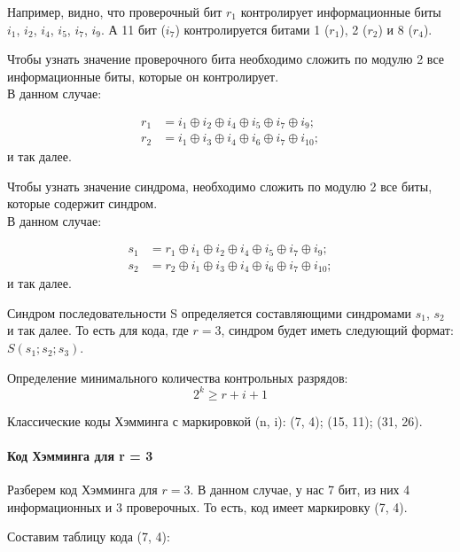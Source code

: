 Например, видно, что проверочный бит $r_1$ контролирует информационные биты $i_1$, $i_2$, $i_4$, $i_5$, $i_7$, $i_9$.
А 11 бит ($i_7$) контролируется битами 1 ($r_1$), 2 ($r_2$) и 8 ($r_4$).

Чтобы узнать значение проверочного бита необходимо сложить по модулю 2 все информационные биты, которые он контролирует. \\
В данном случае:

\noindent
\begin{equation*}
    \begin{aligned}
    r_1 &= i_1\oplus i_2\oplus i_4\oplus i_5\oplus i_7\oplus i_9; \\
    r_2 &= i_1\oplus i_3\oplus i_4\oplus i_6\oplus i_7\oplus i_{10};
    \end{aligned}
\end{equation*}
и так далее.

Чтобы узнать значение синдрома, необходимо сложить по модулю 2 все биты, которые содержит синдром.\\
В данном случае:

\noindent
\begin{equation*}
    \begin{aligned}
    s_1 &= r_1\oplus i_1\oplus i_2\oplus i_4\oplus i_5\oplus i_7\oplus i_9; \\
    s_2 &= r_2\oplus i_1\oplus i_3\oplus i_4\oplus i_6\oplus i_7\oplus i_{10};
    \end{aligned}
\end{equation*}
и так далее.

Синдром последовательности S определяется составляющими синдромами $s_1$, $s_2$ и так далее.
То есть для кода, где $r = 3$, синдром будет иметь следующий формат: $S(s_1;s_2;s_3)$.

Определение минимального количества контрольных разрядов: \[2^k \ge r + i + 1\]

\noindent
Классические коды Хэмминга с маркировкой (n, i): (7, 4); (15, 11); (31, 26).

\paragraph{Код Хэмминга для r = 3}\label{par:hamming-code-r3}

Разберем код Хэмминга для $r = 3$.
В данном случае, у нас 7 бит, из них 4 информационных и 3 проверочных.
То есть, код имеет маркировку (7, 4).

\noindent
Составим таблицу кода (7, 4):


